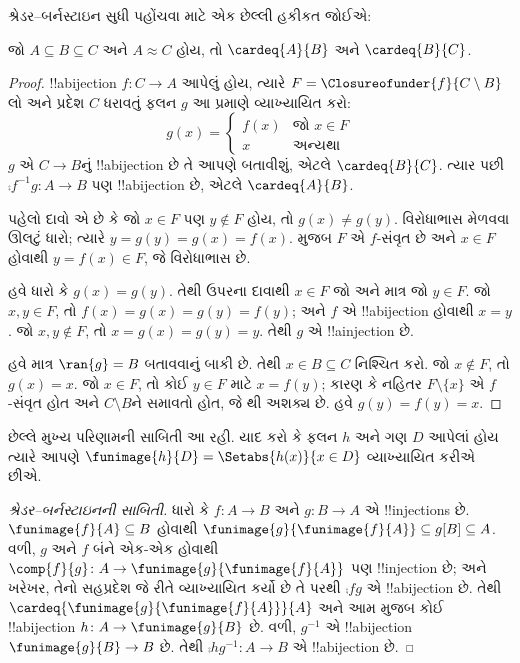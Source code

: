 \documentclass[../../../include/open-logic-section]{subfiles}
\begin{document}
શ્રેડર--બર્નસ્ટાઇન સુધી પહોંચવા માટે એક છેલ્લી હકીકત જોઈએ:

\begin{prop}
જો $A \subseteq B \subseteq C$ અને $A \approx C$ હોય, તો
$\cardeq{A}{B}$ અને $\cardeq{B}{C}$.
\end{prop}

\begin{proof}
!!a{bijection} $f \colon C \to A$ આપેલું હોય, ત્યારે $F =
\Closureofunder{f}{C \setminus B}$ લો અને પ્રદેશ $C$ ધરાવતું ફલન
$g$ આ પ્રમાણે વ્યાખ્યાયિત કરો:
\[
	g(x) =
	\begin{cases}
			f(x) &\text{જો $x \in F$}\\
			x & \text{અન્યથા}
		\end{cases}
\]
$g$ એ $C \to B$નું !!a{bijection} છે તે આપણે બતાવીશું, એટલે
$\cardeq{B}{C}$. ત્યાર પછી $\comp{f^{-1}}{g} \colon A \to B$ પણ
!!a{bijection} છે, એટલે $\cardeq{A}{B}$.

પહેલો દાવો એ છે કે જો $x \in F$ પણ $y\notin F$ હોય, તો
$g(x) \neq g(y)$. વિરોધાભાસ મેળવવા ઊલટું ધારો; ત્યારે
$y = g(y) = g(x) = f(x)$.  મુજબ $F$ એ
$f$-સંવૃત છે અને $x \in F$ હોવાથી $y = f(x) \in F$, જે વિરોધાભાસ છે.

હવે ધારો કે $g(x) = g(y)$. તેથી ઉપરના દાવાથી $x \in F$ જો અને માત્ર
જો $y \in F$. જો $x, y \in F$, તો $f(x) = g (x) = g(y) = f(y)$;
અને $f$ એ !!a{bijection} હોવાથી $x = y$. જો $x, y \notin F$, તો
$x = g(x) = g(y) = y$. તેથી $g$ એ !!a{injection} છે.

હવે માત્ર $\ran{g} = B$ બતાવવાનું બાકી છે. તેથી $x \in B \subseteq C$
નિશ્ચિત કરો. જો $x \notin F$, તો $g(x) = x$. જો $x \in F$, તો કોઈ
$y \in F$ માટે $x = f(y)$; કારણ કે નહિતર $F \setminus \{x\}$ એ
$f$-સંવૃત હોત અને $C\setminus B$ને સમાવતો હોત, જે
થી અશક્ય છે. હવે $g(y) = f(y) = x$.
\end{proof}

છેલ્લે મુખ્ય પરિણામની સાબિતી આ રહી. યાદ કરો કે ફલન $h$ અને ગણ $D$
આપેલાં હોય ત્યારે આપણે $\funimage{h}{D} = \Setabs{h(x)}{x
\in D}$ વ્યાખ્યાયિત કરીએ છીએ.

\begin{proof}[શ્રેડર--બર્નસ્ટાઇનની સાબિતી] ધારો કે $f \colon A \to B$
અને $g \colon B \to A$ એ !!{injection}s છે. $\funimage{f}{A}
\subseteq B$ હોવાથી $\funimage{g}{\funimage{f}{A}} \subseteq
g[B] \subseteq A$. વળી, $g$ અને $f$ બંને એક-એક હોવાથી
$\comp{f}{g} \colon A \to \funimage{g}{\funimage{f}{A}}$ પણ
!!{injection} છે; અને ખરેખર, તેનો સહપ્રદેશ જે રીતે વ્યાખ્યાયિત કર્યો
છે તે પરથી $\comp{f}{g}$ એ !!a{bijection} છે. તેથી
$\cardeq{\funimage{g}{\funimage{f}{A}}}{A}$ અને આમ
 મુજબ કોઈ !!a{bijection} $h \colon A \to
\funimage{g}{B}$ છે. વળી, $g^{-1}$ એ !!a{bijection}
$\funimage{g}{B} \to B$ છે. તેથી $\comp{h}{g^{-1}} \colon A \to B$
એ !!a{bijection} છે.
\end{proof}
\end{document}
